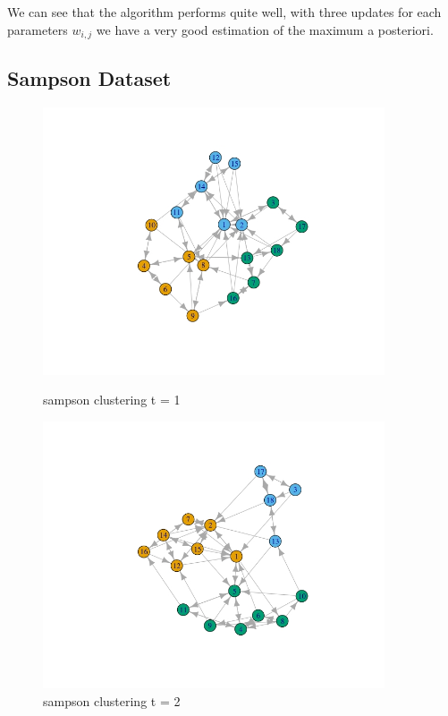 \documentclass[12pt]{ociamthesis}  %
\begin{document}
	We can see that the algorithm performs quite well, with three updates for each parameters $w_{i,j}$ we have a very good estimation of the maximum a posteriori.
	
	\subsection{Sampson Dataset}
	
	\begin{figure}[H]
		\centering
		\begin{minipage}{0.45\textwidth}
			\centering
			\includegraphics[width=0.9\textwidth]{SampsonEM1} %
			\caption{sampson clustering t = 1}
			\label{label-image19}
		\end{minipage}\hfill
		\begin{minipage}{0.45\textwidth}
			\centering
			\includegraphics[width=0.9\textwidth]{sampsonEM2} %
			\caption{sampson clustering t = 2}
			\label{label-image20}
		\end{minipage}
	\end{figure}
\end{document}
